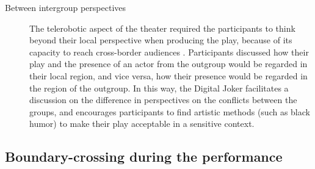 \documentclass[dissertation,math,vertlayout,pdfa,colorlinks]{aaltoseries}
\begin{document}
\begin{description}
   \item[Between intergroup perspectives] The telerobotic aspect of the theater required the participants to think beyond their local perspective when producing the play, because of its capacity to reach cross-border audiences \cite[p. 15]{peledTeleroboticTheaterOppressed2025}. Participants discussed how their play and the presence of an actor from the outgroup would be regarded in their local region, and vice versa, how their presence would be regarded in the region of the outgroup. In this way, the Digital Joker facilitates a discussion on the difference in perspectives on the conflicts between the groups, and encourages participants to find artistic methods (such as black humor) to make their play acceptable in a sensitive context.
\end{description}
\subsection{Boundary-crossing during the performance}
\end{document}

